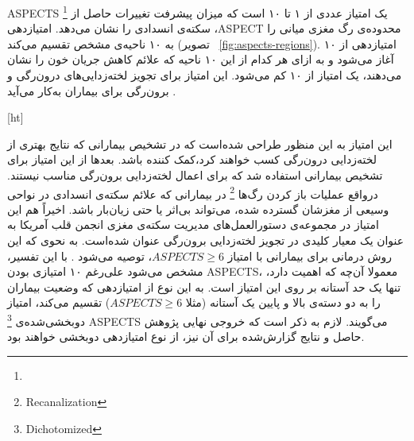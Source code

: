 
ASPECTS 
\footnote{}
یک امتیاز عددی از ۱ تا ۱۰ است که میزان پیشرفت تغییرات حاصل از سکته‌ی انسدادی را 
نشان می‌دهد.
 امتیاز‌دهی ،ASPECT 
 محدوده‌ی رگ مغزی میانی را به ۱۰ ناحیه‌ی مشخص تقسیم می‌کند (تصویر ~\ref{fig:aspects-regions}).
 امتیازدهی  از ۱۰ آغاز می‌شود و به ازای هر کدام از این ۱۰ ناحیه که علائم کاهش جریان 
 خون را نشان می‌دهند، یک امتیاز از ۱۰ کم می‌شود.
 این امتیاز برای تجویز لخته‌زدایی‌های درون‌رگی و برون‌رگی برای بیماران به‌کار می‌آید \cite{mokin2017aspects}.



[ht]

این امتیاز 
به این منظور طراحی شده‌است که 
در تشخیص بیمارانی که نتایج بهتری از لخته‌زدایی درون‌رگی
کسب خواهند کرد،‌کمک کننده باشد.
بعد‌ها از این امتیاز برای تشخیص بیمارانی استفاده شد که برای اعمال لخته‌زدایی برون‌رگی مناسب نیستند.
درواقع عملیات باز کردن رگ‌ها 
\footnote{Recanalization}
در بیمارانی که علائم سکته‌ی انسدادی در نواحی وسیعی از مغزشان گسترده شده، می‌تواند بی‌اثر یا حتی زیان‌بار باشد.
اخیراً هم این امتیاز در
مجموعه‌ی دستور‌العمل‌های مدیریت سکته‌ی مغزی
انجمن قلب آمریکا به عنوان 
 یک معیار کلیدی در تجویز 
 لخته‌زدایی برون‌رگی عنوان شده‌است.
 به نحوی که این روش درمانی برای بیمارانی با امتیاز $ASPECTS\geq 6$، توصیه می‌شود \cite{mokin2017aspects}.
با این تفسیر، مشخص می‌شود علی‌رغم ۱۰ امتیازی بودن ASPECTS، معمولا آن‌چه که اهمیت دارد، تنها یک حد آستانه بر روی این امتیاز است.
به این نوع از امتیازدهی که وضعیت بیماران را به دو دسته‌ی بالا و پایین یک آستانه (مثلا $ASPECTS\geq6$) تقسیم می‌کند، امتیاز دوبخشی‌شده‌ی
\footnote{Dichotomized}
ASPECTS می‌گویند.
لازم به ذکر است که خروجی نهایی پژوهش حاصل و نتایج گزارش‌شده برای آن نیز، از نوع امتیازدهی دو‌بخشی خواهند بود.


